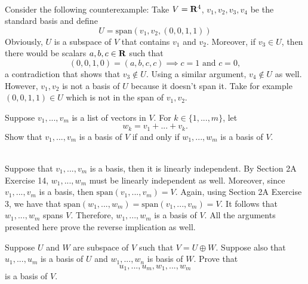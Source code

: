 \begin{solution}
    \\ Consider the following counterexample: Take $V = \mathbf{R}^4$, $v_1, v_2, v_3, v_4$ be the standard basis and define 
    $$U = \text{span}(v_1, v_2, (0,0,1,1))$$
    Obviously, $U$ is a subspace of $V$ that contains $v_1$ and $v_2$. Moreover, if $v_3 \in U$, then there would be scalars $a,b,c \in \mathbf{R}$ such that
    $$(0,0,1,0) = (a,b,c,c) \implies c=1 \text{ and } c=0,$$
    a contradiction that shows that $v_3 \notin U$. Using a similar argument, $v_4 \notin U$ as well. However, $v_1, v_2$ is not a basis of $U$ because it doesn't span it. Take for example $(0,0,1,1) \in U$ which is not in the span of $v_1, v_2$. \\
\end{solution}

\begin{exercise}
    Suppose $v_1, ..., v_m$ is a list of vectors in $V$. For $k \in \{1, ..., m\}$, let
    $$w_k = v_1 + ... + v_k.$$
    Show that $v_1, ..., v_m$ is a basis of $V$ if and only if $w_1, ..., w_m$ is a basis of $V$. \\
\end{exercise}

\begin{solution}
    \\ Suppose that $v_1, ..., v_m$ is a basis, then it is linearly independent. By Section 2A Exercise 14, $w_1, ..., w_m$ must be linearly independent as well. Moreover, since $v_1, ..., v_m$ is a basis, then $\text{span}(v_1, ..., v_m) = V$. Again, using Section 2A Exercise 3, we have that $\text{span}(w_1, ..., w_m) = \text{span}(v_1, ..., v_m) = V$. It follows that $w_1, ..., w_m$ spans $V$. Therefore, $w_1, ..., w_m$ is a basis of $V$. All the arguments presented here prove the reverse implication as well. \\
\end{solution}

\begin{exercise}
    Suppose $U$ and $W$ are subspace of $V$ such that $V = U \oplus W$. Suppose also that $u_1, ..., u_m$ is a basis of $U$ and $w_1, ..., w_n$ is basis of $W$. Prove that
    $$u_1, ..., u_m, w_1, ..., w_m$$
    is a basis of $V$. \\
\end{exercise}

